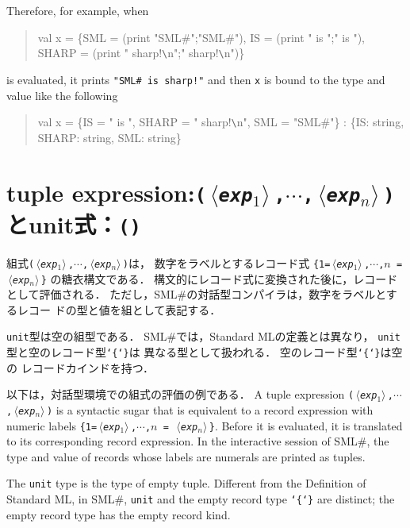 \documentclass{jbook}
\newcommand{\txt}[2]{#2}
\newcommand{\smlsharp}{SML\#}
\newcommand{\code}[1]{\mbox{\large\tt #1}}
\newcommand{\nonterm}[1]{\mbox{$\,\langle$}{\it #1}\mbox{$\rangle\,$}}
\newcommand{\term}[1]{\mbox{{\tt #1}}}
\newenvironment{program}{\begin{quote}\begin{tt}}%
                        {\end{tt}\end{quote}}
\begin{document}
	Therefore, for example, when
\begin{program}
val x = \{SML = (print "SML\#";"SML\#"), 
          IS = (print " is ";" is "),
          SHARP = (print " sharp!\verb|\|n";" sharp!\verb|\|n")\}
\end{program}
is evaluated,
it prints \code{"SML\# is sharp!"} and then
\code{x} is bound to the type and value like the following
\begin{program}
val x = \{IS = " is ", SHARP = " sharp!\verb|\|n", SML = "SML\#"\} : \{IS: string, SHARP: string, SML: string\}
\end{program}

\fi%


\section{\txt{組式}{tuple expression}:\term{(\nonterm{exp$_1$},$\cdots$,\nonterm{exp$_n$})}とunit式：\term{()}}

\ifjp%
	組式\term{(\nonterm{exp$_1$},$\cdots$,\nonterm{exp$_n$})}は，
数字をラベルとするレコード式
\term{\{1=\nonterm{exp$_1$},$\cdots$,$n$ = \nonterm{exp$_n$}\}}
の糖衣構文である．
	構文的にレコード式に変換された後に，レコードとして評価される．
	ただし，\smlsharp{}の対話型コンパイラは，数字をラベルとするレコー
ドの型と値を組として表記する．

	\code{unit}型は空の組型である．
	\smlsharp{}では，Standard MLの定義とは異なり，
\code{unit}型と空のレコード型\code{\char`\{\char`\}}は
異なる型として扱われる．
	空のレコード型\code{\char`\{\char`\}}は空の
レコードカインドを持つ．

	以下は，対話型環境での組式の評価の例である．
\else%
	A tuple expression
\term{(\nonterm{exp$_1$},$\cdots$,\nonterm{exp$_n$})} is a
syntactic sugar that is equivalent to
a record expression with numeric labels
\term{\{1=\nonterm{exp$_1$},$\cdots$,$n$ = \nonterm{exp$_n$}\}}.
	Before it is evaluated,
it is translated to its corresponding record expression.
	In the interactive session of \smlsharp{},
the type and value of records whose labels are numerals are printed
as tuples.

	The \code{unit} type is the type of empty tuple.
	Different from the Definition of Standard ML,
in \smlsharp{}, \code{unit} and the empty record type
\code{\char`\{\char`\}} are distinct;
the empty record type has the empty record kind.
\end{document}
